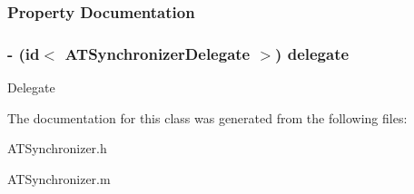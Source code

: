 \subsubsection{Property Documentation}
\hypertarget{interface_a_t_synchronizer_abef36e70ffe47396911ae10ed7c565a7}{
\subsubsection[{delegate}]{\setlength{\rightskip}{0pt plus 5cm}-\/ (id$<$ {\bf ATSynchronizerDelegate} $>$) delegate}}
\label{interface_a_t_synchronizer_abef36e70ffe47396911ae10ed7c565a7}
Delegate 

The documentation for this class was generated from the following files:\begin{DoxyCompactItemize}
\item 
ATSynchronizer.h\item 
ATSynchronizer.m\end{DoxyCompactItemize}
